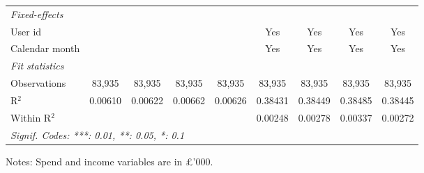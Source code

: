 \begin{table}[htbp]
\begin{threeparttable}[b]
\begin{tabular}{lcccccccc}
         \midrule
         \emph{Fixed-effects}\\
         User id                     &                    &                    &                    &                    & Yes                 & Yes                 & Yes                 & Yes\\  
         Calendar month              &                    &                    &                    &                    & Yes                 & Yes                 & Yes                 & Yes\\  
         \midrule
         \emph{Fit statistics}\\
         Observations                & 83,935             & 83,935             & 83,935             & 83,935             & 83,935              & 83,935              & 83,935              & 83,935\\  
         R$^2$                       & 0.00610            & 0.00622            & 0.00662            & 0.00626            & 0.38431             & 0.38449             & 0.38485             & 0.38445\\  
         Within R$^2$                &                    &                    &                    &                    & 0.00248             & 0.00278             & 0.00337             & 0.00272\\  
         \midrule \midrule
         \multicolumn{9}{l}{\emph{Signif. Codes: ***: 0.01, **: 0.05, *: 0.1}}\\
      \end{tabular}
      
      \begin{tablenotes}\footnotesize
         \item Notes: Spend and income variables are in \pounds'000.
      \end{tablenotes}
   \end{threeparttable}
\end{table}


